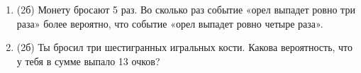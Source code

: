 \documentclass[a4paper, 12pt]{article}
\begin{document}
\begin{enumerate}
\item (2б) Монету бросают 5 раз. Во сколько раз событие «орел выпадет ровно три раза» более вероятно, что событие «орел выпадет ровно четыре раза». 
\item (2б) Ты бросил три шестигранных игральных кости. Какова вероятность, что у тебя в сумме выпало 13 очков? 




\end{enumerate}
\end{document}
